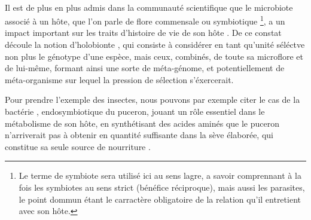 

\paragraph{} %
\label{par:intro1}

Il est de plus en plus admis dans la communauté scientifique que le microbiote
associé à un hôte, que l'on parle de flore commensale ou symbiotique
\footnote{Le terme de symbiote sera utilisé ici au sens lagre, a savoir
comprennant à la fois les symbiotes au sens strict (bénéfice réciproque), mais
aussi les parasites, le point dommun étant le carractère obligatoire de la
relation qu'il entretient avec son hôte.}, a un impact important sur les
traits d'histoire de vie de son hôte \cite{feldhaar2011}. De ce constat
découle la notion d'holobionte \cite{rosenberg2007}, qui consiste à considérer
en tant qu'unité séléctve non plus le génotype d'une espèce, mais ceux,
combinés, de toute sa microflore et de lui-même, formant ainsi une sorte de
méta-génome, et potentiellement de méta-organisme sur lequel la pression de
sélection s'éxercerait.

Pour prendre l'exemple des insectes, nous pouvons par exemple citer le cas de
la bactérie ,  endosymbiotique du puceron, jouant un rôle
essentiel dans le métabolisme de son hôte,  en synthétisant des acides aminés
que le puceron n'arriverait pas à obtenir en quantité suffisante dans la sève
élaborée, qui constitue sa seule source de nourriture \cite{douglas1998}.




